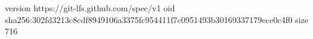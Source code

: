 version https://git-lfs.github.com/spec/v1
oid sha256:302fd3213c8cdf8949106a3375fc954411f7c0951493b30169337179ece0c4f0
size 716
